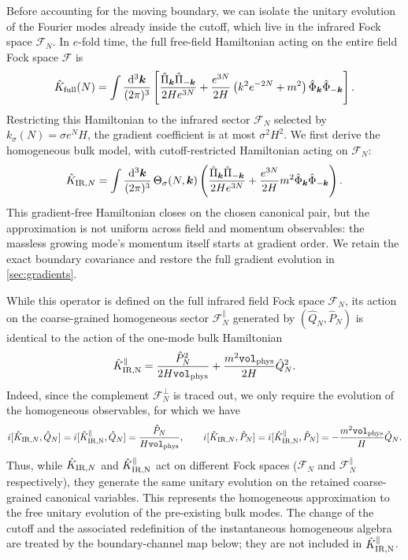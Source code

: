\documentclass{article}
\newcommand{\Vphys}{\mathtt{vol}_{\rm phys}}
\newcommand{\hvarphi}{\hat{\Phi}}
\newcommand{\hpi}{\hat{\Pi}}
\numberwithin{equation}{section}
\begin{document}
	Before accounting for the moving boundary, we can isolate the unitary evolution of the Fourier modes already inside the cutoff, which live in the infrared Fock space $\mathcal{F}_N$. In $e$-fold time, the full free-field Hamiltonian acting on the entire field Fock space $\mathcal{F}$ is
	\begin{equation}\label{eq:KFullModesMain}
		\hat K_{\rm full}(N)
		= \int \frac{\dd^3\bm{k}}{(2\pi)^3}
		\left[
		\frac{\hpi_{\bm{k}}\hpi_{-\bm{k}}}{2H e^{3N}}
		+\frac{e^{3N}}{2H}\left(k^2e^{-2N}+m^2\right)
		\hvarphi_{\bm{k}}\hvarphi_{-\bm{k}}
		\right] .
	\end{equation}
	Restricting this Hamiltonian to the infrared sector $\mathcal{F}_N$ selected by $k_\sigma(N)=\sigma e^NH$, the gradient coefficient is at most $\sigma^2H^2$. We first derive the homogeneous bulk model, with cutoff-restricted Hamiltonian acting on $\mathcal{F}_N$:
	\begin{equation}\label{eq:KIRModesMain}
		\hat K_{{\rm IR},N}
		= \int \frac{\dd^3\bm{k}}{(2\pi)^3}\,\Theta_\sigma(N,\bm{k})
		\left(
		\frac{\hpi_{\bm{k}}\hpi_{-\bm{k}}}{2H e^{3N}}
		+\frac{e^{3N}}{2H}m^2
		\hvarphi_{\bm{k}}\hvarphi_{-\bm{k}}
		\right) .
	\end{equation}
	This gradient-free Hamiltonian closes on the chosen canonical pair, but the approximation is not uniform across field and momentum observables: the massless growing mode's momentum itself starts at gradient order. We retain the exact boundary covariance and restore the full gradient evolution in \cref{sec:gradients}.

	While this operator is defined on the full infrared field Fock space $\mathcal{F}_N$, its action on the coarse-grained homogeneous sector $\mathcal{F}_N^\parallel$ generated by $(\hat Q_N,\hat P_N)$ is identical to the action of the one-mode bulk Hamiltonian
	\begin{equation}\label{eq:KbulkMain}
		\hat K_{\rm IR, N}^{\parallel}
		= \frac{\hat P_N^2}{2H\Vphys}
		+ \frac{m^2\Vphys}{2H}\hat Q_N^2 .
	\end{equation}
	Indeed, since the complement $\mathcal{F}_N^\perp$ is traced out, we only require the evolution of the homogeneous observables, for which we have
	\begin{equation}
		i[\hat K_{{\rm IR},N},\hat Q_N]
		=i[\hat K_{\rm IR, N}^{\parallel},\hat Q_N]
		= \frac{\hat P_N}{H\Vphys},
		\qquad
		i[\hat K_{{\rm IR},N},\hat P_N]
		=i[\hat K_{\rm IR, N}^{\parallel},\hat P_N]
		= -\frac{m^2\Vphys}{H}\hat Q_N .
	\end{equation}
	Thus, while $\hat K_{{\rm IR},N}$ and $\hat K_{\rm IR, N}^{\parallel}$ act on different Fock spaces ($\mathcal{F}_N$ and $\mathcal{F}_N^\parallel$ respectively), they generate the same unitary evolution on the retained coarse-grained canonical variables. This represents the homogeneous approximation to the free unitary evolution of the pre-existing bulk modes. The change of the cutoff and the associated redefinition of the instantaneous homogeneous algebra are treated by the boundary-channel map below; they are not included in $\hat K_{\rm IR, N}^{\parallel}$.
\end{document}
